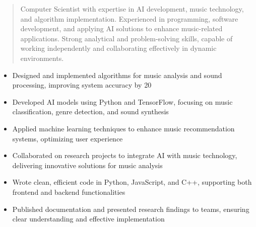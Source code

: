 



\makecvheader

\begin{quote}
  \noindent
  Computer Scientist with expertise in AI development, music technology, and algorithm implementation. Experienced in programming, software development, and applying AI solutions to enhance music-related applications. Strong analytical and problem-solving skills, capable of working independently and collaborating effectively in dynamic environments.
\end{quote}

\par\smallskip
\noindent
\begin{minipage}{20cm}
  \begin{minipage}{9.75cm}
    \begin{itemize}
      \item Designed and implemented algorithms for music analysis and sound processing, improving system accuracy by 20%
      \item Developed AI models using Python and TensorFlow, focusing on music classification, genre detection, and sound synthesis
      \item Applied machine learning techniques to enhance music recommendation systems, optimizing user experience
    \end{itemize}
  \end{minipage}
  \hfill
  \begin{minipage}{9.75cm}
    \begin{itemize}
      \item Collaborated on research projects to integrate AI with music technology, delivering innovative solutions for music analysis
      \item Wrote clean, efficient code in Python, JavaScript, and C++, supporting both frontend and backend functionalities
      \item Published documentation and presented research findings to teams, ensuring clear understanding and effective implementation
    \end{itemize}
  \end{minipage}
\end{minipage}
\par\smallskip
\divider

